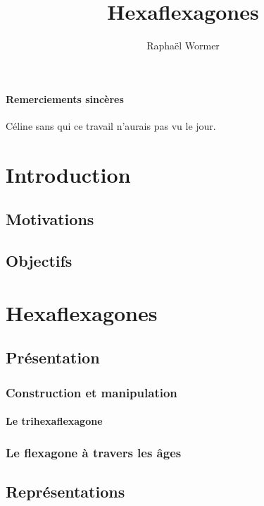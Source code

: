 \documentclass[10pt,a4paper]{article}
\author{Raphaël Wormer}
\title{Hexaflexagones}
\begin{document}
\maketitle
\tableofcontents

\paragraph{Remerciements sincères}Céline sans qui ce travail n'aurais pas vu le jour.


\section{Introduction}\label{intro}
	\subsection{Motivations}\label{motiv}
	\subsection{Objectifs}\label{objtf}



\section{Hexaflexagones}\label{hexa-1}


	\subsection{Présentation}\label{hexa-pres}
	
		\subsubsection{Construction et manipulation}\label{constr-1}
			\paragraph{Le trihexaflexagone}

		\subsubsection{Le flexagone à travers les âges}\label{hexa-histo}


	\subsection{Représentations}\label{hexa-repr}
\end{document}
